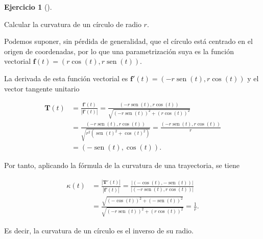 \documentclass[
  a4paper,
]{scrreport}
\theoremstyle{definition}
\newtheorem{exercise}{Ejercicio}[chapter]
\theoremstyle{remark}
\begin{document}
\begin{exercise}[]\protect\hypertarget{exr-curvatura-circulo}{}\label{exr-curvatura-circulo}

Calcular la curvatura de un círculo de radio \(r\).

\end{exercise}

\begin{tcolorbox}[enhanced jigsaw, left=2mm, coltitle=black, colbacktitle=quarto-callout-tip-color!10!white, opacitybacktitle=0.6, colback=white, breakable, titlerule=0mm, toptitle=1mm, rightrule=.15mm, bottomtitle=1mm, bottomrule=.15mm, toprule=.15mm, leftrule=.75mm, arc=.35mm, opacityback=0, title=\textcolor{quarto-callout-tip-color}{\faLightbulb}\hspace{0.5em}{Solución}, colframe=quarto-callout-tip-color-frame]

Podemos suponer, sin pérdida de generalidad, que el círculo está
centrado en el origen de coordenadas, por lo que una parametrización
suya es la función vectorial
\(\mathbf{f}(t) = (r\cos(t),r\operatorname{sen}(t))\).

La derivada de esta función vectorial es
\(\mathbf{f}'(t)= (-r\operatorname{sen}(t), r\cos(t))\) y el vector
tangente unitario

\begin{align*}
\mathbf{T}(t) 
&= \frac{\mathbf{f}'(t)}{|\mathbf{f}'(t)|}
= \frac{(-r\operatorname{sen}(t), r\cos(t))}{\sqrt{(-r\operatorname{sen}(t))^2 +(r\cos(t))^2}} \\
&= \frac{(-r\operatorname{sen}(t), r\cos(t))}{\sqrt{r^2(\operatorname{sen}(t)^2 +\cos(t)^2)}}
=\frac{(-r\operatorname{sen}(t), r\cos(t))}{r} \\
&= (-\operatorname{sen}(t), \cos(t)).
\end{align*}

Por tanto, aplicando la fórmula de la curvatura de una trayectoria, se
tiene

\begin{align*}
\kappa(t) 
&= \frac{|\mathbf{T}'(t)|}{|\mathbf{f}'(t)|} 
= \frac{|(-\cos(t), -\operatorname{sen}(t))|}{|(-r\operatorname{sen}(t), r\cos(t))|} \\
&= \frac{\sqrt{(-\cos(t))^2+(-\operatorname{sen}(t))^2}}{\sqrt{(-r\operatorname{sen}(t))^2 +(r\cos(t))^2}}
= \frac{1}{r}.
\end{align*}

Es decir, la curvatura de un círculo es el inverso de su radio.

\end{tcolorbox}
\end{document}
